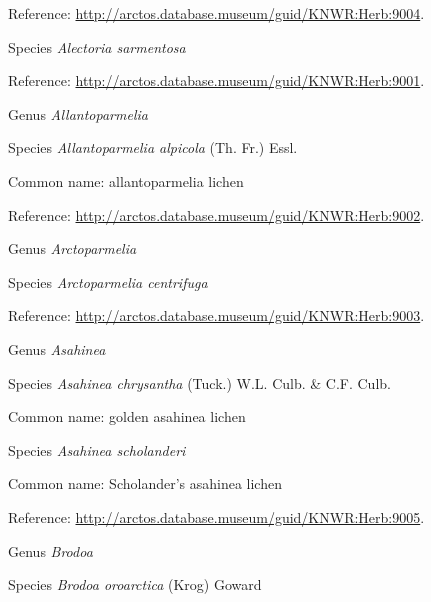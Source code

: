 \documentclass[9pt, article]{memoir}
\begin{document}
\begin{multicols}{2}
Reference: 
\url{http://arctos.database.museum/guid/KNWR:Herb:9004}.

\vspace{6pt}\noindent\hspace{36pt}Species \textit{Alectoria sarmentosa}


Reference: 
\url{http://arctos.database.museum/guid/KNWR:Herb:9001}.

\vspace{6pt}\noindent\hspace{30pt}Genus \textit{Allantoparmelia}


\vspace{6pt}\noindent\hspace{36pt}Species \textit{Allantoparmelia alpicola} (Th. Fr.) Essl.


Common name: allantoparmelia lichen

Reference: 
\url{http://arctos.database.museum/guid/KNWR:Herb:9002}.

\vspace{6pt}\noindent\hspace{30pt}Genus \textit{Arctoparmelia}


\vspace{6pt}\noindent\hspace{36pt}Species \textit{Arctoparmelia centrifuga}


Reference: 
\url{http://arctos.database.museum/guid/KNWR:Herb:9003}.

\vspace{6pt}\noindent\hspace{30pt}Genus \textit{Asahinea}


\vspace{6pt}\noindent\hspace{36pt}Species \textit{Asahinea chrysantha} (Tuck.) W.L. Culb. \& C.F. Culb.


Common name: golden asahinea lichen

\vspace{6pt}\noindent\hspace{36pt}Species \textit{Asahinea scholanderi}


Common name: Scholander's asahinea lichen

Reference: 
\url{http://arctos.database.museum/guid/KNWR:Herb:9005}.

\vspace{6pt}\noindent\hspace{30pt}Genus \textit{Brodoa}


\vspace{6pt}\noindent\hspace{36pt}Species \textit{Brodoa oroarctica} (Krog) Goward



\end{multicols}
\end{document}
